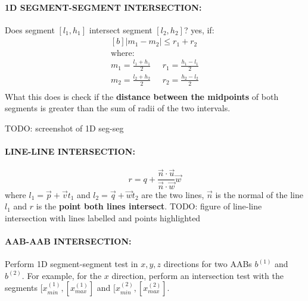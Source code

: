 \documentclass{article}
\begin{document}
\paragraph{}

\paragraph{{1D SEGMENT-SEGMENT INTERSECTION: }} Does segment $[l_1,h_1]$ intersect segment $[l_2,h_2]$? yes, if:
\begin{equation}
\begin{aligned}[b]
	|m_1 - m_2| \leq r_1 + r_2 \\
	\text{where:}\\
	m_1 = \frac{l_1 + h_1}{2} \;\;\;\;\; r_1 = \frac{h_1 - l_1}{2} \\
	m_2 = \frac{l_2 + h_2}{2} \;\;\;\;\; r_2 = \frac{h_2 - l_2}{2} \\
\end{aligned}
\label{eq:1d-segment-segment-test}
\end{equation}
What this does is check if the \textbf{distance between the midpoints} of both segments is greater than the sum of radii of the two intervals.

TODO: screenshot of 1D seg-seg
\paragraph{}

\paragraph{{LINE-LINE INTERSECTION: }}
\begin{equation}
	r = q + \frac{\vec{n} \cdot \vec{u}}{\vec{n} \cdot \vec{w}} \vec{w}
\end{equation}
where $l_1 = \vec{p} + \vec{v}t_1$ and $l_2 = \vec{q} + \vec{w}t_2$  are the two lines, $\vec{n}$ is the normal of the line $l_1$ and $r$ is the \textbf{point both lines intersect}.
TODO: figure of line-line intersection with lines labelled and points highlighted
\paragraph{}

\paragraph{{AAB-AAB INTERSECTION: }} Perform 1D segment-segment test in $x,y,z$ directions for two AABs $b^{(1)}$ and $b^{(2)}$. For example, for the $x$ direction, perform an intersection test with the segments $[x_{min}^{(1)}, [x_{max}^{(1)}]$ and $[x_{min}^{(2)}, [x_{max}^{(2)}]$.
\end{document}
